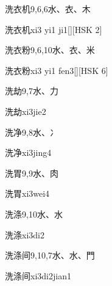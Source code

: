 \begin{Entry}{洗衣机}{9,6,6}{⽔、⾐、⽊}
  \begin{Phonetics}{洗衣机}{xi3 yi1 ji1}[][HSK 2]
  \end{Phonetics}
\end{Entry}

\begin{Entry}{洗衣粉}{9,6,10}{⽔、⾐、⽶}
  \begin{Phonetics}{洗衣粉}{xi3 yi1 fen3}[][HSK 6]
  \end{Phonetics}
\end{Entry}

\begin{Entry}{洗劫}{9,7}{⽔、⼒}
  \begin{Phonetics}{洗劫}{xi3jie2}
  \end{Phonetics}
\end{Entry}

\begin{Entry}{洗净}{9,8}{⽔、⼎}
  \begin{Phonetics}{洗净}{xi3jing4}
  \end{Phonetics}
\end{Entry}

\begin{Entry}{洗胃}{9,9}{⽔、⾁}
  \begin{Phonetics}{洗胃}{xi3wei4}
  \end{Phonetics}
\end{Entry}

\begin{Entry}{洗涤}{9,10}{⽔、⽔}
  \begin{Phonetics}{洗涤}{xi3di2}
  \end{Phonetics}
\end{Entry}

\begin{Entry}{洗涤间}{9,10,7}{⽔、⽔、⾨}
  \begin{Phonetics}{洗涤间}{xi3di2jian1}
  \end{Phonetics}
\end{Entry}

